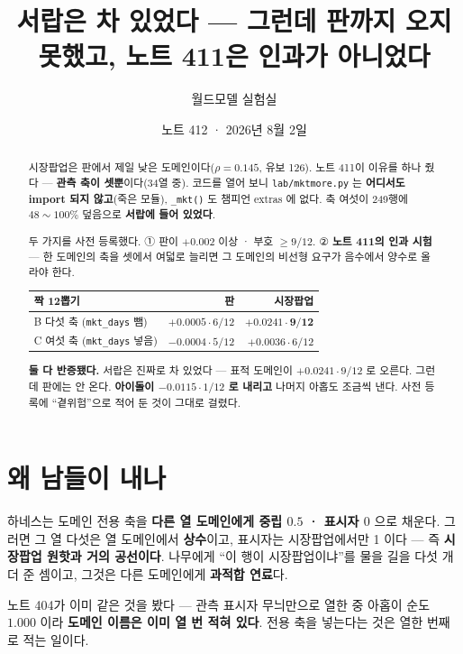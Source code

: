 \documentclass[11pt]{article}
\begin{document}
\title{서랍은 차 있었다 --- 그런데 판까지 오지 못했고, 노트 411은 인과가 아니었다}
\author{월드모델 실험실}
\date{노트 412 · 2026년 8월 2일}
\maketitle

\begin{abstract}
시장팝업은 판에서 제일 낮은 도메인이다($\rho = 0.145$, 유보 126). 노트 411이
이유를 하나 줬다 --- \textbf{관측 축이 셋뿐}이다(34열 중). 코드를 열어 보니
\texttt{lab/mktmore.py} 는 \textbf{어디서도 import 되지 않고}(죽은 모듈),
\texttt{\_mkt()} 도 챔피언 extras 에 없다. 축 여섯이 249행에 $48\sim100\%$
덮음으로 \textbf{서랍에 들어 있었다}.

두 가지를 사전 등록했다. ① 판이 $+0.002$ 이상 · 부호 $\ge 9/12$.
② \textbf{노트 411의 인과 시험} --- 한 도메인의 축을 셋에서 여덟로 늘리면
그 도메인의 비선형 요구가 음수에서 양수로 올라야 한다.

\begin{center}
\begin{tabular}{lrr}
\hline
짝 12뽑기 & 판 & 시장팝업 \\
\hline
B 다섯 축 (\texttt{mkt\_days} 뺌) & $+0.0005 \cdot 6/12$ & $\mathbf{+0.0241 \cdot 9/12}$ \\
C 여섯 축 (\texttt{mkt\_days} 넣음) & $-0.0004 \cdot 5/12$ & $+0.0036 \cdot 6/12$ \\
\hline
\end{tabular}
\end{center}

\textbf{둘 다 반증됐다.} 서랍은 진짜로 차 있었다 --- 표적 도메인이
$+0.0241 \cdot 9/12$ 로 오른다. 그런데 판에는 안 온다. \textbf{아이돌이
$-0.0115 \cdot 1/12$ 로 내리고} 나머지 아홉도 조금씩 낸다. 사전 등록에
``곁위험''으로 적어 둔 것이 그대로 걸렸다.
\end{abstract}

\section{왜 남들이 내나}

하네스는 도메인 전용 축을 \textbf{다른 열 도메인에게 중립 $0.5$ · 표시자
$0$} 으로 채운다. 그러면 그 열 다섯은 열 도메인에서 \textbf{상수}이고,
표시자는 시장팝업에서만 1 이다 --- 즉 \textbf{시장팝업 원핫과 거의
공선이다}. 나무에게 ``이 행이 시장팝업이냐''를 물을 길을 다섯 개 더 준
셈이고, 그것은 다른 도메인에게 \textbf{과적합 연료}다.

노트 404가 이미 같은 것을 봤다 --- 관측 표시자 무늬만으로 열한 중 아홉이
순도 $1.000$ 이라 \textbf{도메인 이름은 이미 열 번 적혀 있다}. 전용 축을
넣는다는 것은 열한 번째로 적는 일이다.
\end{document}
